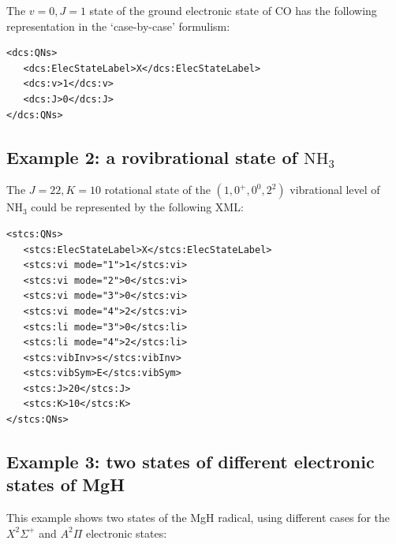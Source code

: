 \documentclass[a4paper]{article} \pagestyle{plain}
\begin{document}
The $v=0, J=1$ state of the ground electronic state of CO has the following representation in the `case-by-case' formulism:

\begin{verbatim}
<dcs:QNs>
   <dcs:ElecStateLabel>X</dcs:ElecStateLabel>
   <dcs:v>1</dcs:v>
   <dcs:J>0</dcs:J>
</dcs:QNs>
\end{verbatim}

\subsection*{Example 2: a rovibrational state of $\mathrm{NH_3}$}

The $J=22, K=10$ rotational state of the $(1,0^+,0^0,2^2)$ vibrational level of $\mathrm{NH_3}$ could be represented by the following XML:

\begin{verbatim}
<stcs:QNs>
   <stcs:ElecStateLabel>X</stcs:ElecStateLabel>
   <stcs:vi mode="1">1</stcs:vi>
   <stcs:vi mode="2">0</stcs:vi>
   <stcs:vi mode="3">0</stcs:vi>
   <stcs:vi mode="4">2</stcs:vi>
   <stcs:li mode="3">0</stcs:li>
   <stcs:li mode="4">2</stcs:li>
   <stcs:vibInv>s</stcs:vibInv>
   <stcs:vibSym>E</stcs:vibSym>
   <stcs:J>20</stcs:J>
   <stcs:K>10</stcs:K>
</stcs:QNs>
\end{verbatim}

\subsection*{Example 3: two states of different electronic states of MgH}

This example shows two states of the MgH radical, using different cases for the $X^2\Sigma^+$ and $A^2\Pi$ electronic states:
\end{document}
